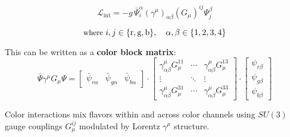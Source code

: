 \documentclass{article}
\begin{document}
    \[
        \mathcal{L}_{\text{int}} = -g\, \bar{\Psi}_i^\alpha (\gamma^\mu)_{\alpha\beta} (G_\mu)^{ij} \Psi_j^\beta
    \]

    \[
        \text{\small where } i,j \in \{\text{r},\text{g},\text{b}\}, \quad \alpha,\beta \in \{1,2,3,4\}
    \]

    \bigskip

    \noindent
    This can be written as a \textbf{color block matrix}:
    \[
        \bar{\Psi} \gamma^\mu G_\mu \Psi =
        \begin{bmatrix}
            \bar{\psi}_{r\alpha} & \bar{\psi}_{g\alpha} & \bar{\psi}_{b\alpha}
        \end{bmatrix}
        \cdot
        \begin{bmatrix}
            \gamma^\mu_{\alpha\beta} G_\mu^{11} & \cdots & \gamma^\mu_{\alpha\beta} G_\mu^{13} \\
            \vdots & \ddots & \vdots \\
            \gamma^\mu_{\alpha\beta} G_\mu^{31} & \cdots & \gamma^\mu_{\alpha\beta} G_\mu^{33}
        \end{bmatrix}
        \cdot
        \begin{bmatrix}
            \psi_{r\beta} \\ \psi_{g\beta} \\ \psi_{b\beta}
        \end{bmatrix}
    \]

    \bigskip

    \noindent
    Color interactions mix flavors within and across color channels using $SU(3)$ gauge couplings $G_\mu^{ij}$ modulated by Lorentz $\gamma^\mu$ structure.
\end{document}
